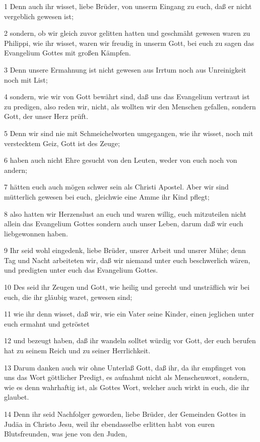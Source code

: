 \par 1 Denn auch ihr wisset, liebe Brüder, von unserm Eingang zu euch, daß er nicht vergeblich gewesen ist;
\par 2 sondern, ob wir gleich zuvor gelitten hatten und geschmäht gewesen waren zu Philippi, wie ihr wisset, waren wir freudig in unserm Gott, bei euch zu sagen das Evangelium Gottes mit großen Kämpfen.
\par 3 Denn unsere Ermahnung ist nicht gewesen aus Irrtum noch aus Unreinigkeit noch mit List;
\par 4 sondern, wie wir von Gott bewährt sind, daß uns das Evangelium vertraut ist zu predigen, also reden wir, nicht, als wollten wir den Menschen gefallen, sondern Gott, der unser Herz prüft.
\par 5 Denn wir sind nie mit Schmeichelworten umgegangen, wie ihr wisset, noch mit verstecktem Geiz, Gott ist des Zeuge;
\par 6 haben auch nicht Ehre gesucht von den Leuten, weder von euch noch von andern;
\par 7 hätten euch auch mögen schwer sein als Christi Apostel. Aber wir sind mütterlich gewesen bei euch, gleichwie eine Amme ihr Kind pflegt;
\par 8 also hatten wir Herzenslust an euch und waren willig, euch mitzuteilen nicht allein das Evangelium Gottes sondern auch unser Leben, darum daß wir euch liebgewonnen haben.
\par 9 Ihr seid wohl eingedenk, liebe Brüder, unsrer Arbeit und unsrer Mühe; denn Tag und Nacht arbeiteten wir, daß wir niemand unter euch beschwerlich wären, und predigten unter euch das Evangelium Gottes.
\par 10 Des seid ihr Zeugen und Gott, wie heilig und gerecht und unsträflich wir bei euch, die ihr gläubig waret, gewesen sind;
\par 11 wie ihr denn wisset, daß wir, wie ein Vater seine Kinder, einen jeglichen unter euch ermahnt und getröstet
\par 12 und bezeugt haben, daß ihr wandeln solltet würdig vor Gott, der euch berufen hat zu seinem Reich und zu seiner Herrlichkeit.
\par 13 Darum danken auch wir ohne Unterlaß Gott, daß ihr, da ihr empfinget von uns das Wort göttlicher Predigt, es aufnahmt nicht als Menschenwort, sondern, wie es denn wahrhaftig ist, als Gottes Wort, welcher auch wirkt in euch, die ihr glaubet.
\par 14 Denn ihr seid Nachfolger geworden, liebe Brüder, der Gemeinden Gottes in Judäa in Christo Jesu, weil ihr ebendasselbe erlitten habt von euren Blutsfreunden, was jene von den Juden,
